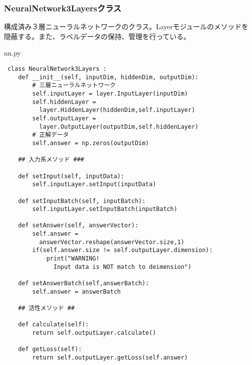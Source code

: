 \documentclass{ujarticle} %
\begin{document}
\subsubsection{NeuralNetwork3Layersクラス}
構成済み３層ニューラルネットワークのクラス。Layerモジュールのメソッドを隠蔽する。また、ラベルデータの保持、管理を行っている。

\begin{itembox}[l]{nn.py}
  \begin{verbatim}
 class NeuralNetwork3Layers :
    def __init__(self, inputDim, hiddenDim, outputDim):
        # 三層ニューラルネットワーク
        self.inputLayer = layer.InputLayer(inputDim)
        self.hiddenLayer =
          layer.HiddenLayer(hiddenDim,self.inputLayer)
        self.outputLayer =
          layer.OutputLayer(outputDim,self.hiddenLayer)
        # 正解データ
        self.answer = np.zeros(outputDim)

    ## 入力系メソッド ###

    def setInput(self, inputData):
        self.inputLayer.setInput(inputData)

    def setInputBatch(self, inputBatch):
        self.inputLayer.setInputBatch(inputBatch)

    def setAnswer(self, answerVector):
        self.answer =
          answerVector.reshape(answerVector.size,1)
        if(self.answer.size != self.outputLayer.dimension):
            print("WARNING!
              Input data is NOT match to deimension")

    def setAnswerBatch(self,answerBatch):
        self.answer = answerBatch

    ## 活性メソッド ##

    def calculate(self):
        return self.outputLayer.calculate()

    def getLoss(self):
        return self.outputLayer.getLoss(self.answer)
  \end{verbatim}
\end{itembox}
\end{document}
